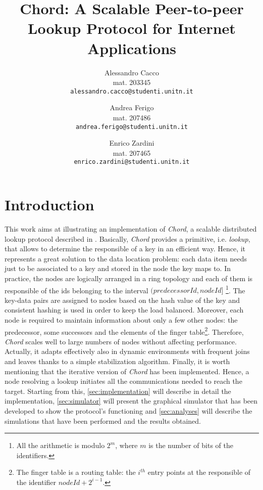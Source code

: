 \documentclass[11pt,twocolumn,letterpaper]{article}
\begin{document}
	
	\title{Chord: A Scalable Peer-to-peer Lookup Protocol for Internet Applications}
	
	\author{Alessandro Cacco\\
		mat. 203345\\
		{\tt\small alessandro.cacco@studenti.unitn.it}
		\and
		Andrea Ferigo\\
		mat. 207486\\
		{\tt\small andrea.ferigo@studenti.unitn.it}
		\and
		Enrico Zardini\\
		mat. 207465\\
		{\tt\small enrico.zardini@studenti.unitn.it}
	}
	\date{}
	\maketitle
	
	\section{Introduction}
	\label{sec:intro}
	This work aims at illustrating an implementation of \textit{Chord}, a scalable distributed lookup protocol described in \cite{chord}. Basically, \textit{Chord} provides a primitive, i.e. \textit{lookup}, that allows to determine the responsible of a key in an efficient way. Hence, it represents a great solution to the data location problem: each data item needs just to be associated to a key and stored in the node the key maps to. \newline 
	In practice, the nodes are logically arranged in a ring topology and each of them is responsible of the ids belonging to the interval $(predecessorId, nodeId]$ \footnote{All the arithmetic is modulo $2^m$, where $m$ is the number of bits of the identifiers.}. The key-data pairs are assigned to nodes based on the hash value of the key and consistent hashing is used in order to keep the load balanced. Moreover, each node is required to maintain information about only a few other nodes: the predecessor, some successors and the elements of the finger table\footnote{The finger table is a routing table: the $i^{th}$ entry points at the responsible of the identifier $nodeId+2^{i-1}$.}. Therefore, \textit{Chord} scales well to large numbers of nodes without affecting performance. Actually, it adapts effectively also in dynamic environments with frequent joins and leaves thanks to a simple stabilization algorithm. \newline
	Finally, it is worth mentioning that the iterative version of \textit{Chord} has been implemented. Hence, a node resolving a lookup initiates all the communications needed to reach the target. \newline
	Starting from this, \cref{sec:implementation} will describe in detail the implementation, \cref{sec:simulator} will present the graphical simulator that has been developed to show the protocol's functioning and \cref{sec:analyses} will describe the simulations that have been performed and the results obtained. 
	
\end{document}
